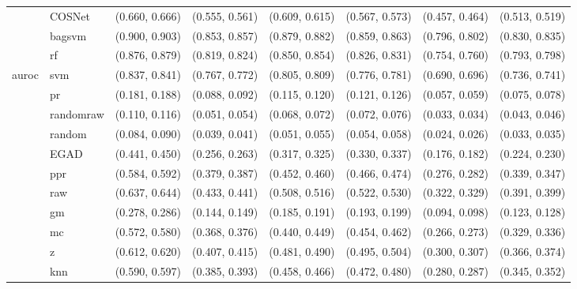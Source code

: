 \begin{table}[H]
{\begin{tabular}{llllllll}
 & COSNet & (0.660, 0.666) & (0.555, 0.561) & (0.609, 0.615) & (0.567, 0.573) & (0.457, 0.464) & (0.513, 0.519)\\

 & bagsvm & (0.900, 0.903) & (0.853, 0.857) & (0.879, 0.882) & (0.859, 0.863) & (0.796, 0.802) & (0.830, 0.835)\\

 & rf & (0.876, 0.879) & (0.819, 0.824) & (0.850, 0.854) & (0.826, 0.831) & (0.754, 0.760) & (0.793, 0.798)\\

\multirow{-15}{*}{\raggedright\arraybackslash auroc} & svm & (0.837, 0.841) & (0.767, 0.772) & (0.805, 0.809) & (0.776, 0.781) & (0.690, 0.696) & (0.736, 0.741)\\
\cmidrule{1-8}
 & pr & (0.181, 0.188) & (0.088, 0.092) & (0.115, 0.120) & (0.121, 0.126) & (0.057, 0.059) & (0.075, 0.078)\\

 & randomraw & (0.110, 0.116) & (0.051, 0.054) & (0.068, 0.072) & (0.072, 0.076) & (0.033, 0.034) & (0.043, 0.046)\\

 & random & (0.084, 0.090) & (0.039, 0.041) & (0.051, 0.055) & (0.054, 0.058) & (0.024, 0.026) & (0.033, 0.035)\\

 & EGAD & (0.441, 0.450) & (0.256, 0.263) & (0.317, 0.325) & (0.330, 0.337) & (0.176, 0.182) & (0.224, 0.230)\\

 & ppr & (0.584, 0.592) & (0.379, 0.387) & (0.452, 0.460) & (0.466, 0.474) & (0.276, 0.282) & (0.339, 0.347)\\

 & raw & (0.637, 0.644) & (0.433, 0.441) & (0.508, 0.516) & (0.522, 0.530) & (0.322, 0.329) & (0.391, 0.399)\\

 & gm & (0.278, 0.286) & (0.144, 0.149) & (0.185, 0.191) & (0.193, 0.199) & (0.094, 0.098) & (0.123, 0.128)\\

 & mc & (0.572, 0.580) & (0.368, 0.376) & (0.440, 0.449) & (0.454, 0.462) & (0.266, 0.273) & (0.329, 0.336)\\

 & z & (0.612, 0.620) & (0.407, 0.415) & (0.481, 0.490) & (0.495, 0.504) & (0.300, 0.307) & (0.366, 0.374)\\

 & knn & (0.590, 0.597) & (0.385, 0.393) & (0.458, 0.466) & (0.472, 0.480) & (0.280, 0.287) & (0.345, 0.352)\\


\end{tabular}}
\end{table}
